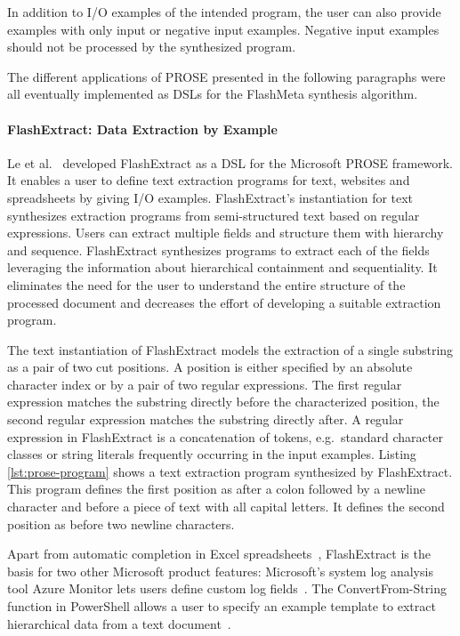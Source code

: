 \documentclass[\myrootdir/main.tex]{subfiles}
\begin{document}
In addition to I/O examples of the intended program, the user can also provide examples with only input or negative input examples.
Negative input examples should not be processed by the synthesized program.

The different applications of PROSE presented in the following paragraphs were all eventually implemented as DSLs for the FlashMeta synthesis algorithm.

\paragraph{FlashExtract: Data Extraction by Example}
Le et al.~\cite{le2014flashextract:} developed FlashExtract as a DSL for the Microsoft PROSE framework.
It enables a user to define text extraction programs for text, websites and spreadsheets by giving I/O examples.
FlashExtract's instantiation for text synthesizes extraction programs from semi-structured text based on regular expressions.
Users can extract multiple fields and structure them with hierarchy and sequence.
FlashExtract synthesizes programs to extract each of the fields leveraging the information about hierarchical containment and sequentiality.
It eliminates the need for the user to understand the entire structure of the processed document and decreases the effort of developing a suitable extraction program.

The text instantiation of FlashExtract models the extraction of a single substring as a pair of two cut positions.
A position is either specified by an absolute character index or by a pair of two regular expressions.
The first regular expression matches the substring directly before the characterized position, the second regular expression matches the substring directly after.
A regular expression in FlashExtract is a concatenation of tokens, e.g.\ standard character classes or string literals frequently occurring in the input examples.
Listing \ref{lst:prose-program} shows a text extraction program synthesized by FlashExtract.
This program defines the first position as after a colon followed by a newline character and before a piece of text with all capital letters.
It defines the second position as before two newline characters.

Apart from automatic completion in Excel spreadsheets~\cite{excel2019flashfill}, FlashExtract is the basis for two other Microsoft product features:
Microsoft's system log analysis tool Azure Monitor lets users define custom log fields~\cite{azure2019custom}.
The ConvertFrom-String function in PowerShell allows a user to specify an example template to extract hierarchical data from a text document~\cite{powershell2019convert}.
\end{document}
